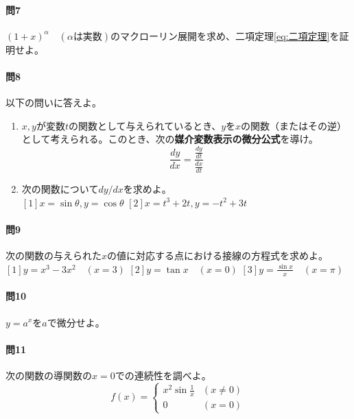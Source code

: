 \documentclass[a4j,dvipdfmx]{jsarticle}
\begin{document}
            \paragraph{問7}$(1+x)^{\alpha}\quad(\alpha\text{は実数})$のマクローリン展開を求め、二項定理\eqref{eq:二項定理}を証明せよ。

            \paragraph{問8}以下の問いに答えよ。
                \begin{enumerate}\setcounter{enumi}{0}\renewcommand{\labelenumi}{(\arabic{enumi})}
                    \item $x,y$が変数$t$の関数として与えられているとき、$y$を$x$の関数（またはその逆）として考えられる。このとき、次の\textbf{媒介変数表示の微分公式}を導け。
                    \begin{equation}
                        \frac{dy}{dx}=\frac{\frac{dy}{dt}}{\frac{dx}{dt}}\label{eq:媒介変数の微分公式}
                    \end{equation}
                    \item 次の関数について$dy/dx$を求めよ。\\
                    $[1]x=\sin \theta,y=\cos\theta$\hspace{30mm}
                    $[2]x=t^3+2t,y=-t^2+3t$
                \end{enumerate}
            
            \paragraph{問9}次の関数の与えられた$x$の値に対応する点における接線の方程式を求めよ。\\
                $[1]y=x^3-3x^2\quad(x=3)$\hspace{10mm}
                $[2]y=\tan x\quad(x=0)$\hspace{10mm}
                $\displaystyle[3]y=\frac{\sin x}{x}\quad(x=\pi)$
            \paragraph{問10}$y=a^x$を$a$で微分せよ。

            \paragraph{問11}次の関数の導関数の$x=0$での連続性を調べよ。
                \begin{equation}
                    f(x)=\left\{\begin{array}{cc}
                        x^2\sin\frac{1}{x}&(x\neq 0)\\
                        0&(x=0)
                    \end{array}\right.
                \end{equation}
            \clearpage
\end{document}

